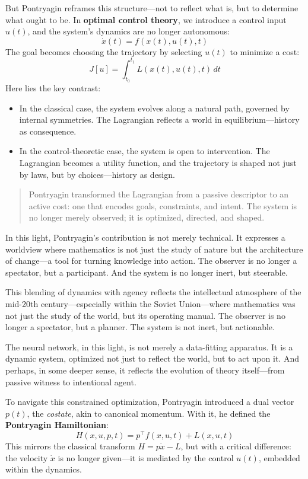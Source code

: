 But Pontryagin reframes this structure—not to reflect what is, but to determine what ought to be. In \textbf{optimal control theory}, we introduce a control input \( u(t) \), and the system’s dynamics are no longer autonomous:
\[
\dot{x}(t) = f(x(t), u(t), t)
\]
The goal becomes choosing the trajectory by selecting \( u(t) \) to minimize a cost:
\[
J[u] = \int_{t_0}^{t_1} L(x(t), u(t), t) \, dt
\]
Here lies the key contrast:

\begin{itemize}
  \item In the classical case, the system evolves along a natural path, governed by internal symmetries. The Lagrangian reflects a world in equilibrium—history as consequence.
  \item In the control-theoretic case, the system is open to intervention. The Lagrangian becomes a utility function, and the trajectory is shaped not just by laws, but by choices—history as design.
\end{itemize}

\begin{quote}
Pontryagin transformed the Lagrangian from a passive descriptor to an active cost: one that encodes goals, constraints, and intent. The system is no longer merely observed; it is optimized, directed, and shaped.
\end{quote}

In this light, Pontryagin’s contribution is not merely technical. It expresses a worldview where mathematics is not just the study of nature but the architecture of change—a tool for turning knowledge into action. The observer is no longer a spectator, but a participant. And the system is no longer inert, but steerable.


This blending of dynamics with agency reflects the intellectual atmosphere of the mid-20th century—especially within the Soviet Union—where mathematics was not just the study of the world, but its operating manual. The observer is no longer a spectator, but a planner. The system is not inert, but actionable.

The neural network, in this light, is not merely a data-fitting apparatus. It is a dynamic system, optimized not just to reflect the world, but to act upon it. And perhaps, in some deeper sense, it reflects the evolution of theory itself—from passive witness to intentional agent.

To navigate this constrained optimization, Pontryagin introduced a dual vector \( p(t) \), the \emph{costate}, akin to canonical momentum. With it, he defined the \textbf{Pontryagin Hamiltonian}:
\[
H(x, u, p, t) = p^\top f(x, u, t) + L(x, u, t)
\]
This mirrors the classical transform \( H = p \dot{x} - L \), but with a critical difference: the velocity \( \dot{x} \) is no longer given—it is mediated by the control \( u(t) \), embedded within the dynamics.

